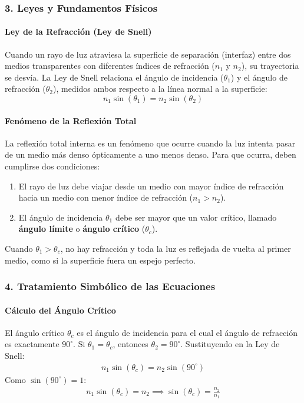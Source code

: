 \subsubsection*{3. Leyes y Fundamentos Físicos}
\paragraph{Ley de la Refracción (Ley de Snell)}
Cuando un rayo de luz atraviesa la superficie de separación (interfaz) entre dos medios transparentes con diferentes índices de refracción ($n_1$ y $n_2$), su trayectoria se desvía. La Ley de Snell relaciona el ángulo de incidencia ($\theta_1$) y el ángulo de refracción ($\theta_2$), medidos ambos respecto a la línea normal a la superficie:
$$ n_1 \sin(\theta_1) = n_2 \sin(\theta_2) $$

\paragraph{Fenómeno de la Reflexión Total}
La reflexión total interna es un fenómeno que ocurre cuando la luz intenta pasar de un medio más denso ópticamente a uno menos denso. Para que ocurra, deben cumplirse dos condiciones:
\begin{enumerate}
    \item El rayo de luz debe viajar desde un medio con mayor índice de refracción hacia un medio con menor índice de refracción ($n_1 > n_2$).
    \item El ángulo de incidencia $\theta_1$ debe ser mayor que un valor crítico, llamado \textbf{ángulo límite} o \textbf{ángulo crítico} ($\theta_c$).
\end{enumerate}
Cuando $\theta_1 > \theta_c$, no hay refracción y toda la luz es reflejada de vuelta al primer medio, como si la superficie fuera un espejo perfecto.

\subsubsection*{4. Tratamiento Simbólico de las Ecuaciones}
\paragraph{Cálculo del Ángulo Crítico}
El ángulo crítico $\theta_c$ es el ángulo de incidencia para el cual el ángulo de refracción es exactamente $90^\circ$. Si $\theta_1 = \theta_c$, entonces $\theta_2 = 90^\circ$. Sustituyendo en la Ley de Snell:
\begin{gather}
    n_1 \sin(\theta_c) = n_2 \sin(90^\circ)
\end{gather}
Como $\sin(90^\circ) = 1$:
\begin{gather}
    n_1 \sin(\theta_c) = n_2 \implies \sin(\theta_c) = \frac{n_2}{n_1}
\end{gather}


